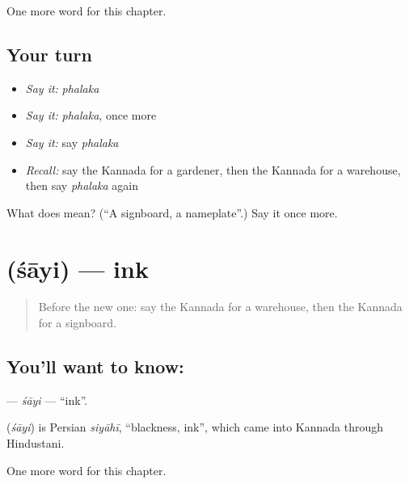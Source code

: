 \begin{grammarlens}[title={What you've built}]
One more word for this chapter.
\end{grammarlens}

\subsection*{Your turn}
\begin{itemize}
\raggedright
  \item \emph{Say it:} \emph{phalaka}
  \item \emph{Say it:} \emph{phalaka}, once more
  \item \emph{Say it:} say \emph{phalaka}
  \item \emph{Recall:} say the Kannada for a gardener, then the Kannada for a warehouse, then say \emph{phalaka} again
\end{itemize}

\begin{tcolorbox}[breakable,colback=teal!4,colframe=teal!35!black,title={Before you move on}]
What does  mean? (\textquotedblleft{}A signboard, a nameplate\textquotedblright{}.) Say it once more.
\end{tcolorbox}
\section[\texorpdfstring{\kn{ಶಾಯಿ} (śāyi)}{ಶಾಯಿ (śāyi)}]{ (śāyi) — ink}

\label{lesson:KA-C307-sayi}



\begin{quote}
Before the new one: say the Kannada for a warehouse, then the Kannada for a signboard.
\end{quote}

\subsection*{You'll want to know: }
\textbf{} — \emph{śāyi} — \textquotedblleft{}ink\textquotedblright{}.

\begin{cousinweb}
\textbf{} (\emph{śāyi}) is Persian \emph{siyāhī}, \textquotedblleft{}blackness, ink\textquotedblright{}, which came into Kannada through Hindustani.
\end{cousinweb}

\begin{grammarlens}[title={What you've built}]
One more word for this chapter.
\end{grammarlens}

